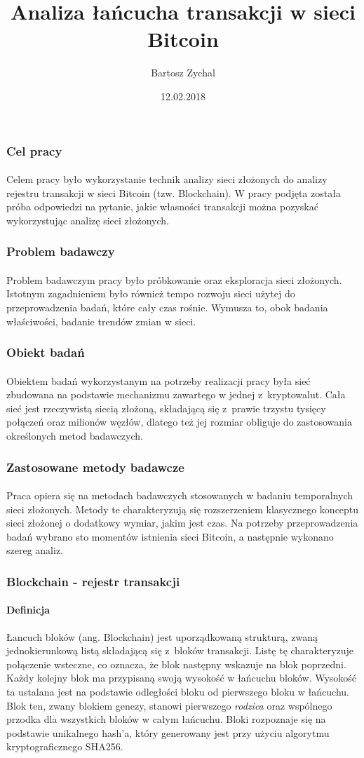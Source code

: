 \documentclass[]{beamer}
\begin{document}
\title{Analiza łańcucha transakcji w sieci Bitcoin}
\subtitle{}
\author{Bartosz Zychal}
\keywords{}
\subject{}
\date{12.02.2018}

\begin{frame}
 \titlepage
\end{frame}

\begin{frame}
 \frametitle{Cel pracy}
 \framesubtitle{}
 \justify
Celem pracy było wykorzystanie technik analizy sieci złożonych do analizy rejestru transakcji w sieci Bitcoin (tzw. Blockchain). W pracy podjęta została próba odpowiedzi na pytanie, jakie własności transakcji można pozyskać wykorzystując analizę sieci złożonych.
\end{frame}


\begin{frame}
 \frametitle{Problem badawczy}
 \framesubtitle{}
 \justify
Problem badawczym pracy było próbkowanie oraz eksploracja sieci złożonych. Istotnym zagadnieniem było również tempo rozwoju sieci użytej do przeprowadzenia badań, które cały czas rośnie. Wymusza to, obok badania właściwości, badanie trendów zmian w sieci.
\end{frame}

\begin{frame}
 \frametitle{Obiekt badań}
 \framesubtitle{}
 \justify
Obiektem badań wykorzystanym na potrzeby realizacji pracy była sieć zbudowana na podstawie mechanizmu zawartego w jednej z~kryptowalut. Cała sieć jest rzeczywistą siecią złożoną, składającą się z~prawie trzystu tysięcy połączeń oraz milionów węzłów, dlatego też jej rozmiar obliguje do zastosowania określonych metod badawczych.
\end{frame}

\begin{frame}
 \frametitle{Zastosowane metody badawcze}
 \framesubtitle{}
 \justify
Praca opiera się na metodach badawczych stosowanych w badaniu temporalnych sieci złożonych. Metody te charakteryzują się rozszerzeniem klasycznego konceptu sieci złożonej o dodatkowy wymiar, jakim jest czas. Na potrzeby przeprowadzenia badań wybrano sto momentów istnienia sieci Bitcoin, a następnie wykonano szereg analiz.
\end{frame}

\begin{frame}
 \frametitle{Blockchain - rejestr transakcji}
 \framesubtitle{Definicja}
 \justify
  Łancuch bloków (ang. Blockchain) jest uporządkowaną strukturą, zwaną jednokierunkową listą składającą się z~bloków transakcji. Listę tę charakteryzuje połączenie wsteczne, co oznacza, że blok następny wskazuje na blok poprzedni. Każdy kolejny blok ma przypisaną swoją wysokość w łańcuchu bloków. Wysokość ta ustalana jest na podstawie odległości bloku od pierwszego bloku w łańcuchu. Blok ten, zwany blokiem genezy, stanowi pierwszego \textit{rodzica} oraz wspólnego przodka dla wszystkich bloków w całym łańcuchu. Bloki rozpoznaje się na podstawie unikalnego hash'a, który generowany jest przy użyciu algorytmu kryptograficznego SHA256.

\end{frame}
\end{document}
